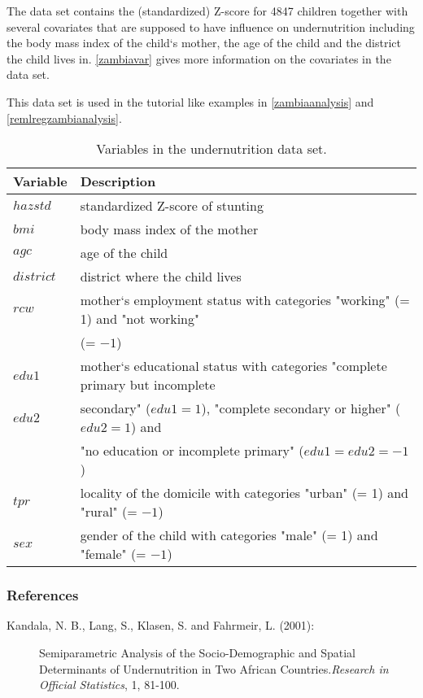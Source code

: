 The data set contains the (standardized) Z-score for 4847 children
together with several covariates that are supposed to have
influence on undernutrition including the body mass index of the
child`s mother, the age of the child and the district the child
lives in. \autoref{zambiavar} gives more information on the
covariates in the data set.

This data set is used in the tutorial like examples in
\autoref{zambiaanalysis} and \autoref{remlregzambianalysis}.

\begin{table}[|h|t|]
\begin{center}
\begin{tabular}{|l|l|}
 \hline
 {\bf Variable} & {\bf Description}\\
 \hline
 $hazstd$ & standardized Z-score of stunting\\
 $bmi$ & body mass index of the mother\\
 $agc$ & age of the child\\
 $district$ & district where the child lives\\
 $rcw$ & mother`s employment status with categories "working" (= 1) and "not working" \\
 & (= $-1$)\\
 $edu1$ & mother`s educational status with categories "complete primary but incomplete\\
 $edu2$ & secondary" ($edu1=1$), "complete secondary or higher" ($edu2=1$) and\\
 & "no education or incomplete primary" ($edu1=edu2=-1$)\\
 $tpr$ & locality of the domicile with categories "urban" (= 1) and "rural" (= $-1$)\\
 $sex$ & gender of the child with categories "male" (= 1) and
 "female" (= $-1$)\\
 \hline
\end{tabular}
{\em\caption{Variables in the undernutrition data set.
\label{zambiavar}}}
\end{center}
\end{table}

\subsubsection*{References}

\begin{description}
\item [Kandala, N. B., Lang, S., Klasen, S. and Fahrmeir, L. (2001):] Semiparametric Analysis of
the Socio-Demographic and Spatial Determinants of Undernutrition
in Two African Countries.{\it Research in Official Statistics}, 1,
81-100.
\end{description}
